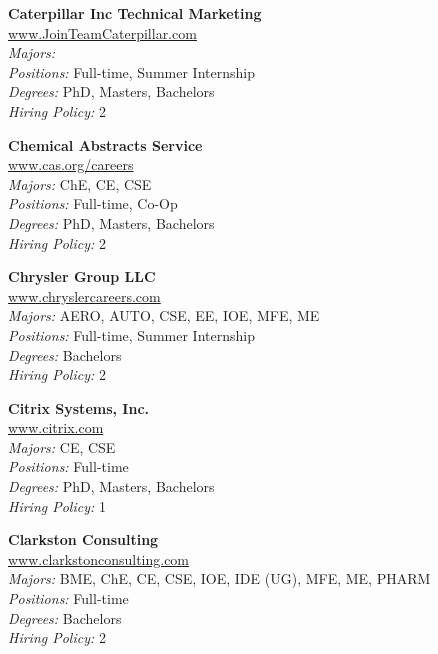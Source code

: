 \documentclass[twoside]{article}
\begin{document}
\begin{center}
\begin{multicols}{3}
\begin{minipage}{.9\columnwidth}{\Large\bf Caterpillar Inc Technical Marketing }\\
	\url{www.JoinTeamCaterpillar.com}\\
	\emph{Majors:} \\
	\emph{Positions:} Full-time, Summer Internship\\
	\emph{Degrees:} PhD, Masters, Bachelors\\
	\emph{Hiring Policy:} 2\\
\end{minipage}
 
\begin{minipage}{.9\columnwidth}{\Large\bf Chemical Abstracts Service }\\
	\url{www.cas.org/careers}\\
	\emph{Majors:} ChE, CE, CSE\\
	\emph{Positions:} Full-time, Co-Op\\
	\emph{Degrees:} PhD, Masters, Bachelors\\
	\emph{Hiring Policy:} 2\\
\end{minipage}
 
\begin{minipage}{.9\columnwidth}{\Large\bf Chrysler Group LLC }\\
	\url{www.chryslercareers.com}\\
	\emph{Majors:} AERO, AUTO, CSE, EE, IOE, MFE, ME\\
	\emph{Positions:} Full-time, Summer Internship\\
	\emph{Degrees:} Bachelors\\
	\emph{Hiring Policy:} 2\\
\end{minipage}
 
\begin{minipage}{.9\columnwidth}{\Large\bf Citrix Systems, Inc. }\\
	\url{www.citrix.com}\\
	\emph{Majors:} CE, CSE\\
	\emph{Positions:} Full-time\\
	\emph{Degrees:} PhD, Masters, Bachelors\\
	\emph{Hiring Policy:} 1\\
\end{minipage}
 
\begin{minipage}{.9\columnwidth}{\Large\bf Clarkston Consulting }\\
	\url{www.clarkstonconsulting.com}\\
	\emph{Majors:} BME, ChE, CE, CSE, IOE, IDE (UG), MFE, ME, PHARM\\
	\emph{Positions:} Full-time\\
	\emph{Degrees:} Bachelors\\
	\emph{Hiring Policy:} 2\\
\end{minipage}
 

\end{multicols}
\end{center}
\end{document}
